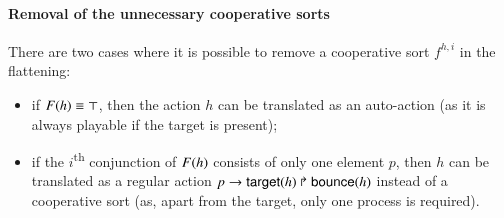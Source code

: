 \paragraph{Removal of the unnecessary cooperative sorts}
There are two cases where it is possible to remove a cooperative sort $f^{h,i}$ in the flattening:
\begin{itemize}
  \item if $F(h) \equiv \top$, then the action $h$ can be translated as an auto-action
    (as it is always playable if the target is present);
  \item if the $i$\textsuperscript{th} conjunction of $F(h)$ consists of only one element $p$,
    then $h$ can be translated as a regular action $p\rightarrow\mathsf{target}(h)\Rsh\mathsf{bounce}(h)$ instead of a cooperative sort
    (as, apart from the target, only one process is required).
\end{itemize}
